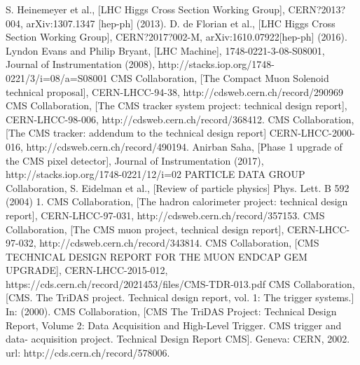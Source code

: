 \begin{thebibliography}{999}
		 S. Heinemeyer et al., [LHC Higgs Cross Section Working Group], CERN?2013?004, arXiv:1307.1347 [hep-ph] (2013).
		 D. de Florian et al., [LHC Higgs Cross Section Working Group], CERN?2017?002-M, arXiv:1610.07922[hep-ph] (2016).
		 Lyndon Evans and Philip Bryant, [LHC Machine], 1748-0221-3-08-S08001, Journal of Instrumentation (2008), http://stacks.iop.org/1748-0221/3/i=08/a=S08001
		 CMS Collaboration, [The Compact Muon Solenoid technical proposal], CERN-LHCC-94-38, http://cdsweb.cern.ch/record/290969
		  CMS Collaboration, [The CMS tracker system project: technical design report], CERN-LHCC-98-006, http://cdsweb.cern.ch/record/368412.
		  CMS Collaboration, [The CMS tracker: addendum to the technical design report] CERN-LHCC-2000-016, http://cdsweb.cern.ch/record/490194.
		 Anirban Saha, [Phase 1 upgrade of the CMS pixel detector], Journal of Instrumentation (2017), http://stacks.iop.org/1748-0221/12/i=02
		 PARTICLE DATA GROUP Collaboration, S. Eidelman et al., [Review of particle physics] Phys. Lett. B 592 (2004) 1.
		  CMS Collaboration, [The hadron calorimeter project: technical design report], CERN-LHCC-97-031, http://cdsweb.cern.ch/record/357153.
		 CMS Collaboration, [The CMS muon project, technical design report], CERN-LHCC-97-032, http://cdsweb.cern.ch/record/343814.
		 CMS Collaboration, [CMS TECHNICAL DESIGN REPORT FOR THE MUON ENDCAP GEM UPGRADE], CERN-LHCC-2015-012, https://cds.cern.ch/record/2021453/files/CMS-TDR-013.pdf
		 CMS Collaboration, [CMS. The TriDAS project. Technical design report, vol. 1: The trigger systems.] In: (2000).
		 CMS Collaboration, [CMS The TriDAS Project: Technical Design Report, Volume 2: Data Acquisition and High-Level Trigger. CMS trigger and data- acquisition project. Technical Design Report CMS]. Geneva: CERN, 2002. url: http://cds.cern.ch/record/578006.
				
           	  
	 
	 \end{thebibliography}
\clearpage{\pagestyle{empty}\cleardoublepage}